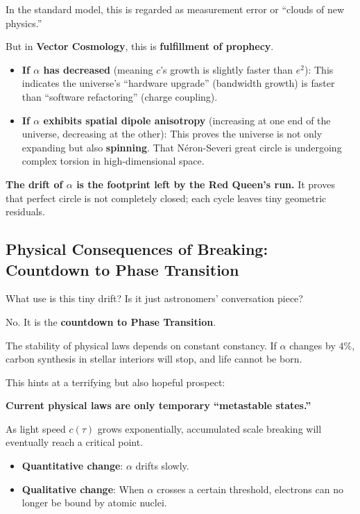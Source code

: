 In the standard model, this is regarded as measurement error or ``clouds of new physics.''

But in \textbf{Vector Cosmology}, this is \textbf{fulfillment of prophecy}.

\begin{itemize}
\item \textbf{If $\alpha$ has decreased} (meaning $c$'s growth is slightly faster than $e^2$): This indicates the universe's ``hardware upgrade'' (bandwidth growth) is faster than ``software refactoring'' (charge coupling).

\item \textbf{If $\alpha$ exhibits spatial dipole anisotropy} (increasing at one end of the universe, decreasing at the other): This proves the universe is not only expanding but also \textbf{spinning}. That Néron-Severi great circle is undergoing complex torsion in high-dimensional space.
\end{itemize}

\textbf{The drift of $\alpha$ is the footprint left by the Red Queen's run.} It proves that perfect circle is not completely closed; each cycle leaves tiny geometric residuals.

\subsection{Physical Consequences of Breaking: Countdown to Phase Transition}

What use is this tiny drift? Is it just astronomers' conversation piece?

No. It is the \textbf{countdown to Phase Transition}.

The stability of physical laws depends on constant constancy. If $\alpha$ changes by $4\%$, carbon synthesis in stellar interiors will stop, and life cannot be born.

This hints at a terrifying but also hopeful prospect:

\textbf{Current physical laws are only temporary ``metastable states.''}

As light speed $c(\tau)$ grows exponentially, accumulated scale breaking will eventually reach a critical point.

\begin{itemize}
\item \textbf{Quantitative change}: $\alpha$ drifts slowly.

\item \textbf{Qualitative change}: When $\alpha$ crosses a certain threshold, electrons can no longer be bound by atomic nuclei.
\end{itemize}

